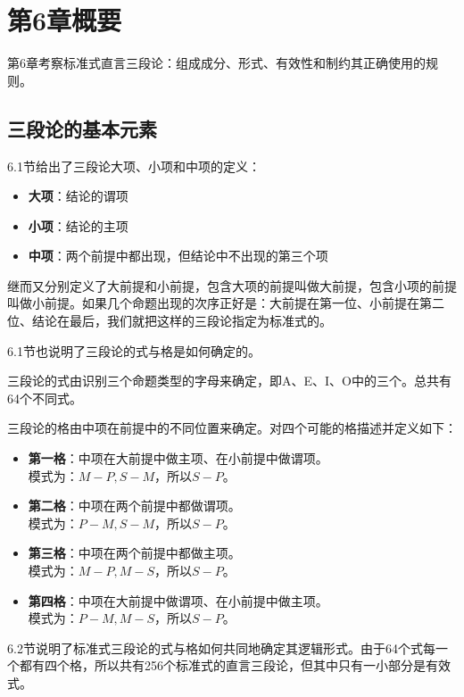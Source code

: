 \section{第6章概要}
第6章考察标准式直言三段论：组成成分、形式、有效性和制约其正确使用的规则。

\subsection{三段论的基本元素}
6.1节给出了三段论大项、小项和中项的定义：

\begin{itemize}
  \item \textbf{大项}：结论的谓项
  \item \textbf{小项}：结论的主项
  \item \textbf{中项}：两个前提中都出现，但结论中不出现的第三个项
\end{itemize}

继而又分别定义了大前提和小前提，包含大项的前提叫做大前提，包含小项的前提叫做小前提。如果几个命题出现的次序正好是：大前提在第一位、小前提在第二位、结论在最后，我们就把这样的三段论指定为标准式的。

6.1节也说明了三段论的式与格是如何确定的。

三段论的式由识别三个命题类型的字母来确定，即A、E、I、O中的三个。总共有64个不同式。

三段论的格由中项在前提中的不同位置来确定。对四个可能的格描述并定义如下：

\begin{itemize}
\item \textbf{第一格}：中项在大前提中做主项、在小前提中做谓项。\\
模式为：$M-P, S-M$，所以$S-P$。

\item \textbf{第二格}：中项在两个前提中都做谓项。\\
模式为：$P-M, S-M$，所以$S-P$。

\item \textbf{第三格}：中项在两个前提中都做主项。\\
模式为：$M-P, M-S$，所以$S-P$。

\item \textbf{第四格}：中项在大前提中做谓项、在小前提中做主项。\\
模式为：$P-M, M-S$，所以$S-P$。
\end{itemize}

6.2节说明了标准式三段论的式与格如何共同地确定其逻辑形式。由于64个式每一个都有四个格，所以共有256个标准式的直言三段论，但其中只有一小部分是有效式。

